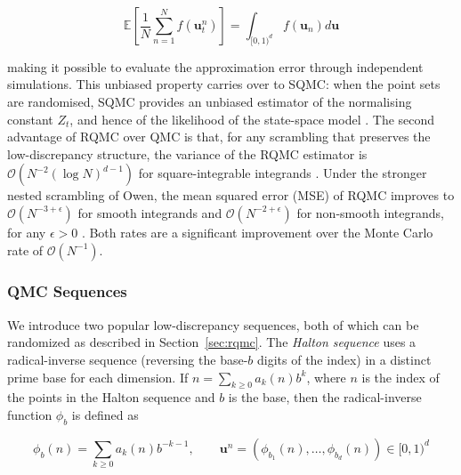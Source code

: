 \begin{equation}
    \mathbb{E}\left[\frac{1}{N}\sum_{n=1}^N f(\mathbf{u}_t^n)\right] = \int_{[0,1)^d} f(\mathbf{u}_n) d\mathbf{u} \nonumber
\end{equation}

making it possible to evaluate the approximation error through independent simulations. This unbiased property carries over to SQMC: when the point sets are randomised, SQMC provides an unbiased estimator of the normalising constant $Z_t$, and hence of the likelihood of the state-space model \citep{chopingerber2015sqmc,delmoral1996}. The second advantage of RQMC over QMC is that, for any scrambling that preserves the low-discrepancy structure, the variance of the RQMC estimator is $\mathcal{O}(N^{-2} (\log N)^{d-1})$ for square-integrable integrands \citep{owen1997scrambling}. Under the stronger nested scrambling of Owen, the mean squared error (MSE) of RQMC improves to $\mathcal{O}(N^{-3+\epsilon})$ for smooth integrands and $\mathcal{O}(N^{-2+\epsilon})$ for non-smooth integrands, for any $\epsilon > 0$ \citep{owen1997scrambling,owen1998scrambling}. Both rates are a significant improvement over the Monte Carlo rate of $\mathcal{O}(N^{-1})$.


\subsubsection{QMC Sequences}
\label{sec:qmc-sequences}

We introduce two popular low-discrepancy sequences, both of which can be randomized as described in Section~\ref{sec:rqmc}. The \emph{Halton sequence} \citep{halton1960quasirandom} uses a radical-inverse sequence (reversing the base-$b$ digits of the index) in a distinct prime base for each dimension. If $n = \sum_{k\geq 0} a_k (n) b^k$, where $n$ is the index of the points in the Halton sequence and $b$ is the base, then the radical-inverse function $\phi_b$ is defined as

\begin{equation}
    \phi_b(n) = \sum_{k\geq 0} a_k (n) b^{-k-1}, \qquad \mathbf{u}^n = (\phi_{b_1}(n), \ldots, \phi_{b_d}(n)) \in [0,1)^d
\end{equation}

